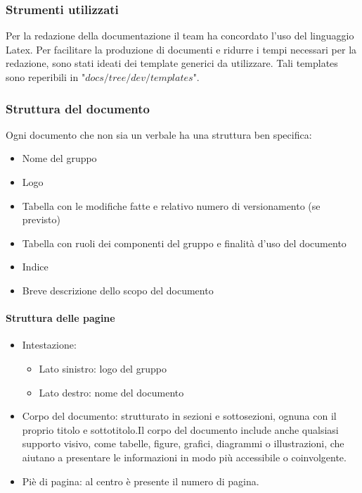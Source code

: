 \documentclass[12pt]{article}
\begin{document}
\subsubsection{Strumenti utilizzati}
Per la redazione della documentazione il team ha concordato l'uso del linguaggio Latex.
Per facilitare la produzione di documenti e ridurre i tempi necessari per la redazione, sono stati ideati dei template generici da utilizzare.
Tali templates sono reperibili in "$docs/tree/dev/templates$".

\subsubsection{Struttura del documento}
Ogni documento che non sia un verbale ha una struttura ben specifica:
\begin{itemize}
    \item Nome del gruppo
    \item Logo 
    \item Tabella con le modifiche fatte e relativo numero di versionamento (se previsto)
    \item Tabella con ruoli dei componenti del gruppo e finalità d'uso del documento
    \item Indice
    \item Breve descrizione dello scopo del documento
\end{itemize}

\paragraph{Struttura delle pagine}
\begin{itemize}
	\item Intestazione:
		\begin{itemize}
			\item Lato sinistro: logo del gruppo
			\item Lato destro: nome del documento
		\end{itemize}
	\item Corpo del documento:  strutturato in sezioni e sottosezioni, ognuna con il proprio titolo e sottotitolo.Il corpo del documento include anche qualsiasi supporto visivo, come tabelle, figure, grafici, 	diagrammi o illustrazioni, che aiutano a presentare le informazioni in modo più accessibile o coinvolgente.
	\item Piè di pagina: al centro è presente il numero di pagina.
\end{itemize}
\end{document}
